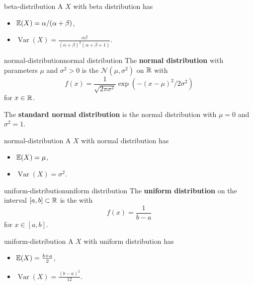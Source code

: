 \begin{example}{beta-distribution}
    A  $X$ with beta distribution has
    \begin{itemize}
        \item {} $\mathbb{E}(X) = \alpha / (\alpha + \beta)$,
        \item {} $\operatorname{Var}(X) = \frac{\alpha \beta}{(\alpha + \beta)^2 (\alpha + \beta + 1)}$.
    \end{itemize}
\end{example}

\begin{topic}{normal-distribution}{normal distribution}
    The \textbf{normal distribution} with parameters $\mu$ and $\sigma^2 > 0$ is the  $\mathcal{N}(\mu, \sigma^2)$ on $\mathbb{R}$ with 
    \[ f(x) = \frac{1}{\sqrt{2 \pi \sigma^2}} \exp( -(x - \mu)^2 / 2 \sigma^2) \]
    for $x \in \mathbb{R}$.

    The \textbf{standard normal distribution} is the normal distribution with $\mu = 0$ and $\sigma^2 = 1$.
\end{topic}

\begin{example}{normal-distribution}
    A  $X$ with normal distribution has
    \begin{itemize}
        \item {} $\mathbb{E}(X) = \mu$,
        \item {} $\operatorname{Var}(X) = \sigma^2$.
    \end{itemize}
\end{example}

\begin{topic}{uniform-distribution}{uniform distribution}
    The \textbf{uniform distribution} on the interval $[a, b] \subset \mathbb{R}$ is the  with 
    \[ f(x) = \frac{1}{b - a} \]
    for $x \in [a, b]$.
\end{topic}

\begin{example}{uniform-distribution}
    A  $X$ with uniform distribution has
    \begin{itemize}
        \item {} $\mathbb{E}(X) = \frac{b + a}{2}$,
        \item {} $\operatorname{Var}(X) = \frac{(b - a)^2}{12}$.
    \end{itemize}
\end{example}

